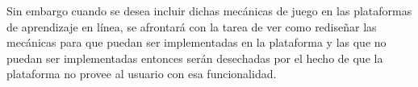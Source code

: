 
\noindent Sin embargo cuando se desea incluir dichas mecánicas de juego en las plataformas de aprendizaje en línea, se afrontará con la tarea de ver como rediseñar las mecánicas para que puedan ser implementadas en la plataforma y las que no puedan ser implementadas entonces serán desechadas por el hecho de que la plataforma no provee al usuario con esa funcionalidad. 

    
    
    
